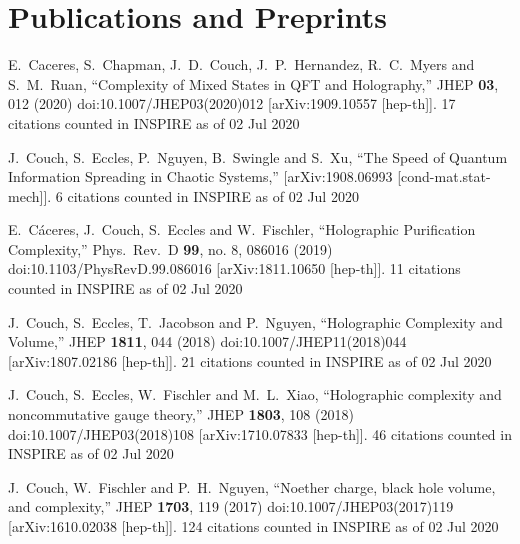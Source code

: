 \documentclass[letterpaper]{article}
\renewenvironment{itemize}{
  \begin{list}{}{
    \setlength{\leftmargin}{1.5em}
  }
}{
  \end{list}
}
\begin{document}
\section*{Publications and Preprints}
\begin{itemize}
  
\item
  E.~Caceres, S.~Chapman, J.~D.~Couch, J.~P.~Hernandez, R.~C.~Myers and S.~M.~Ruan,
  ``Complexity of Mixed States in QFT and Holography,''
  JHEP \textbf{03}, 012 (2020)
  doi:10.1007/JHEP03(2020)012
  [arXiv:1909.10557 [hep-th]].
  17 citations counted in INSPIRE as of 02 Jul 2020

\item
  J.~Couch, S.~Eccles, P.~Nguyen, B.~Swingle and S.~Xu,
  ``The Speed of Quantum Information Spreading in Chaotic Systems,''
  [arXiv:1908.06993 [cond-mat.stat-mech]].
 6 citations counted in INSPIRE as of 02 Jul 2020

\item 
  E.~C\'aceres, J.~Couch, S.~Eccles and W.~Fischler,
  ``Holographic Purification Complexity,''
  Phys.\ Rev.\ D {\bf 99}, no. 8, 086016 (2019)
  doi:10.1103/PhysRevD.99.086016
  [arXiv:1811.10650 [hep-th]].
  11 citations counted in INSPIRE as of 02 Jul 2020

\item 
  J.~Couch, S.~Eccles, T.~Jacobson and P.~Nguyen,
  ``Holographic Complexity and Volume,''
  JHEP {\bf 1811}, 044 (2018)
  doi:10.1007/JHEP11(2018)044
  [arXiv:1807.02186 [hep-th]].
  21 citations counted in INSPIRE as of 02 Jul 2020
  
\item
  J.~Couch, S.~Eccles, W.~Fischler and M.~L.~Xiao,
  ``Holographic complexity and noncommutative gauge theory,''
  JHEP {\bf 1803}, 108 (2018)
  doi:10.1007/JHEP03(2018)108
  [arXiv:1710.07833 [hep-th]].
  46 citations counted in INSPIRE as of 02 Jul 2020

\item  
  J.~Couch, W.~Fischler and P.~H.~Nguyen,
  ``Noether charge, black hole volume, and complexity,''
  JHEP {\bf 1703}, 119 (2017)
  doi:10.1007/JHEP03(2017)119
  [arXiv:1610.02038 [hep-th]].
  124 citations counted in INSPIRE as of 02 Jul 2020

  
\end{itemize}
\end{document}
